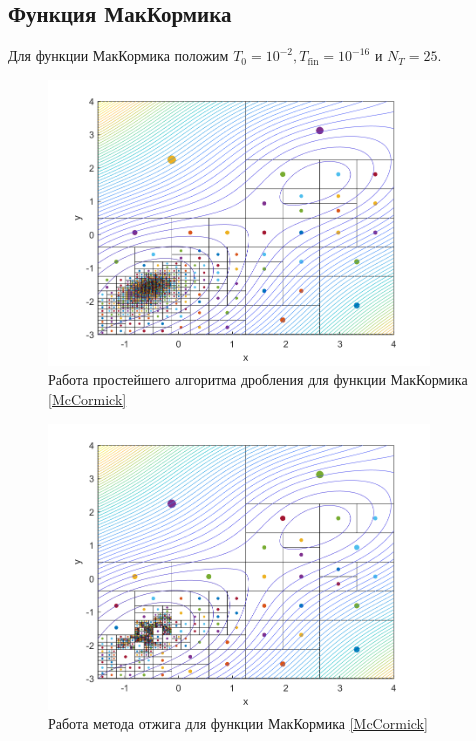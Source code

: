 \subsection{Функция МакКормика}
Для функции МакКормика положим $T_0=10^{-2}, T_{\mathrm{fin}}=10^{-16}$ и $N_T=25$.
\begin{figure}[H]
\centering
\includegraphics[width=0.9\textwidth]{Graphics/TrivialDivide_McCormick_algo.png}
\caption{Работа простейшего алгоритма дробления для функции МакКормика \eqref{McCormick}} 
\end{figure}
\begin{figure}[H]
\centering
\includegraphics[width=0.9\textwidth]{Graphics/SimAnnealing_McCormick_algo.png}
\caption{Работа метода отжига для функции МакКормика \eqref{McCormick}} 
\end{figure}
